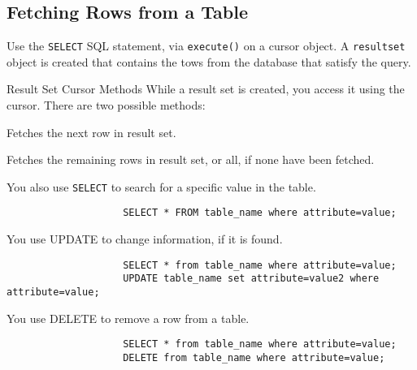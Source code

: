 \documentclass[notes.tex]{subfiles}
\begin{document}
			\subsection{Fetching Rows from a Table}
				Use the \verb|SELECT| SQL statement, via \verb|execute()| on a cursor object. A \verb|resultset| object is created that contains the tows from the database that satisfy the query.
				\begin{sidenote}{Result Set Cursor Methods}
					While a result set is created, you access it using the cursor. There are two possible methods:
					\begin{description}[nosep, font=\texttt]
						\item[cursor.fetchone()] Fetches the next row in result set.
						\item[cursor.fetchall()] Fetches the remaining rows in result set, or all, if none have been fetched.
					\end{description}
				\end{sidenote}
				You also use \verb|SELECT| to search for a specific value in the table.
				\begin{verbatim}
					SELECT * FROM table_name where attribute=value;
				\end{verbatim}
				You use UPDATE to change information, if it is found.
				\begin{verbatim}
					SELECT * from table_name where attribute=value;
					UPDATE table_name set attribute=value2 where attribute=value;
				\end{verbatim}
				You use DELETE to remove a row from a table.
				\begin{verbatim}
					SELECT * from table_name where attribute=value;
					DELETE from table_name where attribute=value;
				\end{verbatim}
\end{document}
